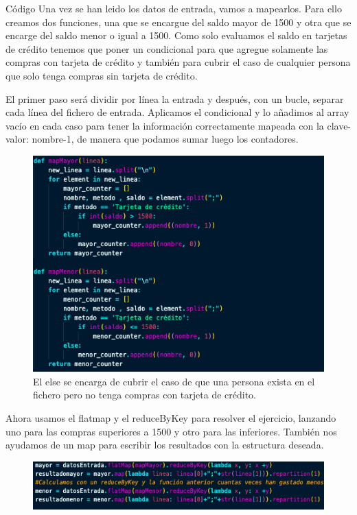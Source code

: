 \documentclass[a4paper]{article}
\begin{document}
\begin{section}{Código}
    Una vez se han leido los datos de entrada, vamos a mapearlos. Para ello creamos dos funciones, una que se encargue del saldo mayor de 1500 y otra que se encarge del saldo menor o igual a 1500. Como solo evaluamos el saldo en tarjetas de crédito tenemos que poner un condicional para que agregue 
    solamente las compras con tarjeta de crédito y también para cubrir el caso de cualquier persona que solo tenga compras sin tarjeta de crédito.

    El primer paso será dividir por línea la entrada y después, con un bucle, separar cada línea del fichero de entrada. Aplicamos el condicional y lo añadimos al array vacío en cada caso para tener la información correctamente mapeada con la clave-valor: nombre-1, de manera que podamos sumar luego los contadores.


    \begin{figure}[h]
        \centering
        \includegraphics[width=\textwidth, keepaspectratio]{codigo1}
        \caption{El else se encarga de cubrir el caso de que una persona exista en el fichero pero no tenga compras con tarjeta de crédito.}

    \end{figure}
    
    Ahora usamos el flatmap y el reduceByKey para resolver el ejercicio, lanzando uno para las compras superiores a 1500 y otro para las inferiores.
    También nos ayudamos de un map para escribir los resultados con la estructura deseada.
\begin{figure}[h]
    \centering
    \includegraphics[width=\textwidth, keepaspectratio]{codigo2}


\end{figure}
\end{section}
\end{document}
